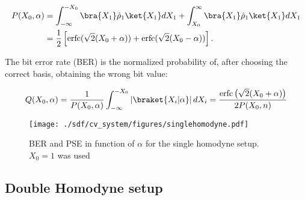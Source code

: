 \documentclass[../../sdf/tex/cv_system]{subfiles}
\begin{document}
\begin{equation}\label{eq:postselecteff}
\begin{aligned}
P(X_0,\alpha)&=\int^{-X_0}_{-\infty}\bra{X_1}\hat{\rho}_1\ket{X_1}dX_1+\int^{\infty}_{X_0}\bra{X_1}\hat{\rho}_1\ket{X_1}dX_1\\
&=\frac{1}{2}\left[\text{erfc}(\sqrt{2}(X_0+\alpha))+\text{erfc}(\sqrt{2}(X_0-\alpha))\right].
\end{aligned}
\end{equation}

The bit error rate (BER) is the normalized probability of, after choosing the correct basis, obtaining the wrong bit value:

\begin{equation}\label{eq:biterrorratio}
Q(X_0,\alpha)=\frac{1}{P(X_0,\alpha)}\int_{-\infty}^{-X_0}\left|\braket{X_i|\alpha}\right|dX_i=\frac{\text{erfc}\left(\sqrt{2}(X_0+\alpha)\right)}{2P(X_0,n)}
\end{equation}

\begin{figure}[h]
\centering
\texttt{[image: ./sdf/cv\_system/figures/singlehomodyne.pdf]}
\caption{BER and PSE in function of $\alpha$ for the single homodyne setup. $X_0=1$ was used}
\label{fig:ber}
\end{figure}



\subsection{Double Homodyne setup}
\end{document}
